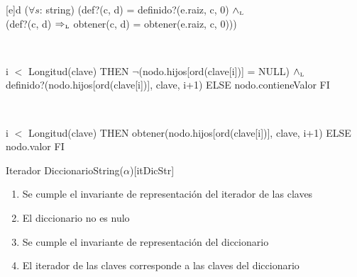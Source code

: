 \begin{Representacion}
	\Abs[dicStr]{\dicString}[e]{d}
	{($\forall s$: string)
	(def?(c, d) = definido?(e.raiz, c, 0) $\land_{\mathrm{\scriptscriptstyle{L}}}$ \\
	(def?(c, d) $\Rightarrow_{\mathrm{\scriptscriptstyle{L}}}$ obtener(c, d) = obtener(e.raiz, c, 0)))
	}

	~

	{\IF i $<$ Longitud(clave) THEN
		$\neg$(nodo.hijos[ord(clave[i])] = NULL) $\land_{\mathrm{\scriptscriptstyle{L}}}$ \\ definido?(nodo.hijos[ord(clave[i])], clave, i+1)
	ELSE
		nodo.contieneValor
	FI}


	~


	{\IF i $<$ Longitud(clave) THEN
		obtener(nodo.hijos[ord(clave[i])], clave, i+1)
	ELSE
		nodo.valor
	FI}



	\begin{Estructura}{Iterador DiccionarioString($\alpha$)}[itDicStr]

		\begin{Tupla}[itDicStr]
		\end{Tupla}

	\end{Estructura}




	\begin{enumerate}

		\item Se cumple el invariante de representación del iterador de las claves

		\item El diccionario no es nulo

		\item Se cumple el invariante de representación del diccionario

		\item El iterador de las claves corresponde a las claves del diccionario

	\end{enumerate}




\end{Representacion}
